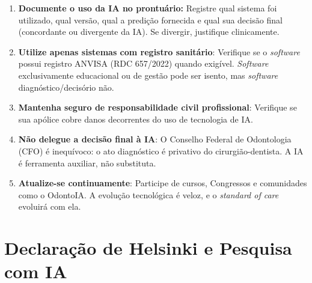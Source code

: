 \begin{enumerate}
  \item \textbf{Documente o uso da IA no prontuário:} Registre qual sistema foi
    utilizado, qual versão, qual a predição fornecida e qual sua decisão final
    (concordante ou divergente da IA). Se divergir, justifique clinicamente.

  \item \textbf{Utilize apenas sistemas com registro sanitário}: Verifique se
    o \textit{software} possui registro ANVISA (RDC 657/2022) quando exigível.
    \textit{Software} exclusivamente educacional ou de gestão pode ser isento,
    mas \textit{software} diagnóstico/decisório não.

  \item \textbf{Mantenha seguro de responsabilidade civil profissional}: Verifique
    se sua apólice cobre danos decorrentes do uso de tecnologia de IA.

  \item \textbf{Não delegue a decisão final à IA}: O Conselho Federal de
    Odontologia (CFO) é inequívoco: o ato diagnóstico é privativo do
    cirurgião-dentista. A IA é ferramenta auxiliar, não substituta.

  \item \textbf{Atualize-se continuamente}: Participe de cursos, Congressos e
    comunidades como o OdontoIA. A evolução tecnológica é veloz, e o
    \textit{standard of care} evoluirá com ela.
\end{enumerate}



\section{Declaração de Helsinki e Pesquisa com IA}
\label{sec:helsinki-ia}

\nivelquatro

